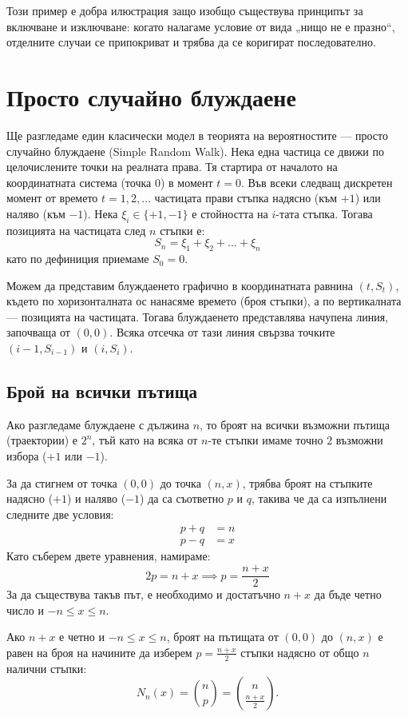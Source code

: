 Този пример е добра илюстрация защо изобщо съществува принципът за включване и изключване:
когато налагаме условие от вида „нищо не е празно“, отделните случаи се припокриват и
трябва да се коригират последователно.

\section{Просто случайно блуждаене}

Ще разгледаме един класически модел в теорията на вероятностите — просто случайно блуждаене (Simple Random Walk).
Нека една частица се движи по целочислените точки на реалната права. Тя стартира от началото на координатната система (точка 0) в момент $t=0$. Във всеки следващ дискретен момент от времето $t=1, 2, \dots$ частицата прави стъпка надясно (към $+1$) или наляво (към $-1$).
Нека $\xi_i \in \{+1, -1\}$ е стойността на $i$-тата стъпка. Тогава позицията на частицата след $n$ стъпки е:
\[ S_n = \xi_1 + \xi_2 + \dots + \xi_n \]
като по дефиниция приемаме $S_0 = 0$.

Можем да представим блуждаенето графично в координатната равнина $(t, S_t)$, където по хоризонталната ос нанасяме времето (броя стъпки), а по вертикалната — позицията на частицата. Тогава блуждаенето представлява начупена линия, започваща от $(0,0)$. Всяка отсечка от тази линия свързва точките $(i-1, S_{i-1})$ и $(i, S_i)$.

\subsection{Брой на всички пътища}
Ако разгледаме блуждаене с дължина $n$, то броят на всички възможни пътища (траектории) е $2^n$, тъй като на всяка от $n$-те стъпки имаме точно 2 възможни избора ($+1$ или $-1$).

За да стигнем от точка $(0,0)$ до точка $(n, x)$, трябва броят на стъпките надясно ($+1$) и наляво ($-1$) да са съответно $p$ и $q$, такива че да са изпълнени следните две условия:
\begin{align*}
p + q &= n \\
p - q &= x
\end{align*}
Като съберем двете уравнения, намираме:
\[ 2p = n + x \implies p = \frac{n+x}{2} \]
За да съществува такъв път, е необходимо и достатъчно $n+x$ да бъде четно число и $-n \leq x \leq n$.
\begin{prop}\label{prop:paths-count}
Ако $n+x$ е четно и $-n \le x \le n$, броят на пътищата от $(0,0)$ до $(n,x)$ е равен на броя на начините да изберем $p = \frac{n+x}{2}$ стъпки надясно от общо $n$ налични стъпки:
\[ N_n(x) = \binom{n}{p} = \binom{n}{\frac{n+x}{2}} . \]
\end{prop}

